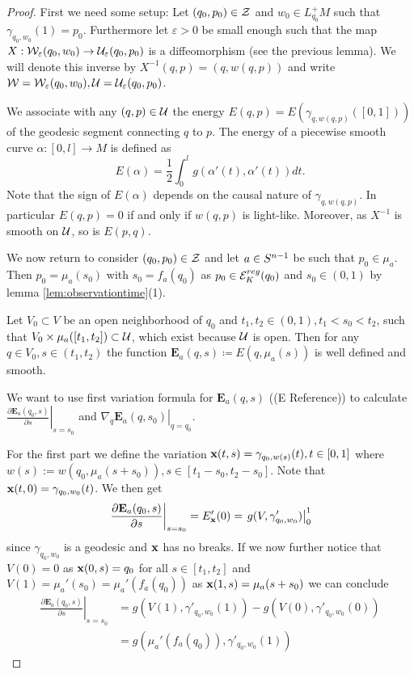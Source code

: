 \begin{proof}
    First we need some setup: Let $(q_0,p_0)\in {\mathcal{Z}}$ and $w_0\in L^+_{q_0}M$ such that $\gamma_{q_0,w_0}(1) = p_0$. Furthermore let $\varepsilon>0$ be small enough such that the map $X:{\mathcal{W}}_\varepsilon(q_0,w_0)\to \mathcal{U}_\varepsilon(q_0,p_0)$ is a diffeomorphism (see the previous lemma). We will denote this inverse by $X^{-1}(q,p) = (q,w(q,p))$ and write ${\mathcal{W}}={\mathcal{W}}_\varepsilon(q_0,w_0), \mathcal{U}=\mathcal{U}_\varepsilon(q_0,p_0)$.
    
    We associate with any $(q,p)\in {\mathcal{U}}$ the energy $E(q,p)=E(\gamma_{q,w(q,p)}([0,1]))$ of the geodesic segment connecting $q$ to $p$. The energy of a piecewise smooth curve $\alpha:[0,l]\to M$ is defined as 
    \[
        E(\alpha) = \frac{1}{2}\int_0^l g(\alpha'(t),\alpha'(t))dt.
    \]
    Note that the sign of $E(\alpha)$ depends on the causal nature of $\gamma_{q,w(q,p)}$. In particular $E(q,p)=0$ if and only if $w(q,p)$ is light-like. Moreover, as $X^{-1}$ is smooth on $\mathcal{U}$, so is $E(p,q)$.
    
    We now return to consider $(q_0,p_0)\in {\mathcal{Z}}$ and let $a\in {S^{n-1}}$ be such that $p_0 \in \mu_a$. Then $p_0=\mu_a(s_0)$ with $s_0=f_a(q_0)$ as $p_0 \in {{\mathcal{E}}^{reg}_K}(q_0)$ and $s_0\in (0,1)$ by lemma \ref{lem:observationtime}(1). 
    
    Let $V_0\subset V$ be an open neighborhood of $q_0$ and $t_1,t_2\in (0,1), t_1<s_0<t_2$, such that $V_0\times\mu_a([t_1,t_2])\subset \mathcal{U}$, which exist because $\mathcal{U}$ is open. Then for any $q\in V_0, s\in (t_1,t_2)$ the function $\mathbf{E}_a(q,s)\coloneqq E(q,\mu_a(s))$ is well defined and smooth.
    
    We want to use first variation formula for $\mathbf{E}_a(q,s)$ ((E Reference)) to calculate $\left.\frac{\partial\mathbf{E}_a(q_0,s)}{\partial s}\right\rvert_{s=s_0}$ and $\left.\nabla_q\mathbf{E}_a(q,s_0)\right\rvert_{q=q_0}$.
    
    For the first part we define the variation $\mathbf{x}(t,s) = \gamma_{q_0,w(s)}(t), t\in [0,1]$ where $w(s):= w(q_0,\mu_a(s+s_0)), s\in [t_1-s_0,t_2-s_0]$. Note that $\mathbf{x}(t,0)=\gamma_{q_0,w_0}(t)$. We then get
    \begin{align*}
        \left.\frac{\partial\mathbf{E}_a(q_0,s)}{\partial s}\right\rvert_{s=s_0} = E'_{\mathbf{x}}(0) =  \left.g(V,\gamma_{q_0,w_0}')\right\rvert^1_0
    \end{align*}
    since $\gamma_{q_0,w_0}$ is a geodesic and $\mathbf{x}$ has no breaks. If we now further notice that $V(0)=0$ as $\mathbf{x}(0,s)=q_0$ for all $s\in[t_1,t_2]$ and $V(1) = \mu_a'(s_0) = \mu_a'(f_a(q_0))$ as $\mathbf{x}(1,s) = \mu_a(s+s_0)$ we can conclude 
    \begin{align*}
        \left.\frac{\partial\mathbf{E}_a(q_0,s)}{\partial s}\right\rvert_{s=s_0} &= g(V(1),\gamma'_{q_0,w_0}(1)) - g(V(0),\gamma'_{q_0,w_0}(0))\\
        &= g(\mu_a'(f_a(q_0)),\gamma'_{q_0,w_0}(1))
    \end{align*}
    

\end{proof}

